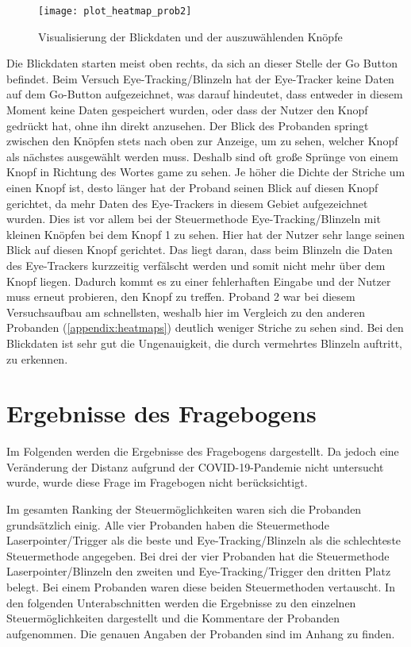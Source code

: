 \begin{figure}[!htbp]
	\centering
	\texttt{[image: plot\_heatmap\_prob2]}
	\caption[Visualisierung der Blickdaten und der auszuwählenden Knöpfe] {Visualisierung der Blickdaten und der auszuwählenden Knöpfe}
	\label{fig:plotheatmapprob2}
\end{figure}

Die Blickdaten starten meist oben rechts, da sich an dieser Stelle der Go Button befindet. Beim Versuch Eye-Tracking/Blinzeln hat der Eye-Tracker keine Daten auf dem Go-Button aufgezeichnet, was darauf hindeutet, dass entweder in diesem Moment keine Daten gespeichert wurden, oder dass der Nutzer den Knopf gedrückt hat, ohne ihn direkt anzusehen. Der Blick des Probanden springt zwischen den Knöpfen stets nach oben zur Anzeige, um zu sehen, welcher Knopf als nächstes ausgewählt werden muss. Deshalb sind oft große Sprünge von einem Knopf in Richtung des Wortes \glqq game\grqq{} zu sehen. Je höher die Dichte der Striche um einen Knopf ist, desto länger hat der Proband seinen Blick auf diesen Knopf gerichtet, da mehr Daten des Eye-Trackers in diesem Gebiet aufgezeichnet wurden. Dies ist vor allem bei der Steuermethode Eye-Tracking/Blinzeln mit kleinen Knöpfen bei dem Knopf 1 zu sehen. Hier hat der Nutzer sehr lange seinen Blick auf diesen Knopf gerichtet. Das liegt daran, dass beim Blinzeln die Daten des Eye-Trackers kurzzeitig verfälscht werden und somit nicht mehr über dem Knopf liegen. Dadurch kommt es zu einer fehlerhaften Eingabe und der Nutzer muss erneut probieren, den Knopf zu treffen. Proband 2 war bei diesem Versuchsaufbau am schnellsten, weshalb hier im Vergleich zu den anderen Probanden (\autoref{appendix:heatmaps}) deutlich weniger Striche zu sehen sind. Bei den Blickdaten ist sehr gut die Ungenauigkeit, die durch vermehrtes Blinzeln auftritt, zu erkennen.

\section{Ergebnisse des Fragebogens}
\label{section:resultquestions}
Im Folgenden werden die Ergebnisse des Fragebogens dargestellt. Da jedoch eine Veränderung der Distanz aufgrund der \ac{COVID-19}-Pandemie nicht untersucht wurde, wurde diese Frage im Fragebogen nicht berücksichtigt. 

Im gesamten Ranking der Steuermöglichkeiten waren sich die Probanden grundsätzlich einig. Alle vier Probanden haben die Steuermethode Laserpointer/Trigger als die beste und Eye-Tracking/Blinzeln als die schlechteste Steuermethode angegeben. Bei drei der vier Probanden hat die Steuermethode Laserpointer/Blinzeln den zweiten und Eye-Tracking/Trigger den dritten Platz belegt. Bei einem Probanden waren diese beiden Steuermethoden vertauscht. In den folgenden Unterabschnitten werden die Ergebnisse zu den einzelnen Steuermöglichkeiten dargestellt und die Kommentare der Probanden aufgenommen. Die genauen Angaben der Probanden sind im Anhang  zu finden.
